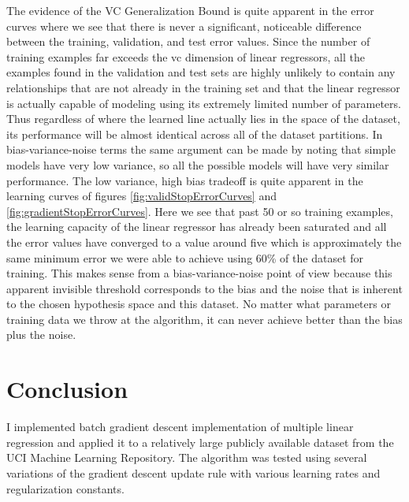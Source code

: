 \documentclass[runningheads]{llncs}
\begin{document}
The evidence of the VC Generalization Bound is quite apparent in the error curves where we see that there is never a significant, noticeable difference between the training, validation, and test error values. Since the number of training examples far exceeds the vc dimension of linear regressors, all the examples found in the validation and test sets are highly unlikely to contain any relationships that are not already in the training set and that the linear regressor is actually capable of modeling using its extremely limited number of parameters. Thus regardless of where the learned line actually lies in the space of the dataset, its performance will be almost identical across all of the dataset partitions. In bias-variance-noise terms the same argument can be made by noting that simple models have very low variance, so all the possible models will have very similar performance. The low variance, high bias tradeoff is quite apparent in the learning curves of figures \ref{fig:validStopErrorCurves} and \ref{fig:gradientStopErrorCurves}. Here we see that past 50 or so training examples, the learning capacity of the linear regressor has already been saturated and all the error values have converged to a value around five which is approximately the same minimum error we were able to achieve using 60\% of the dataset for training. This makes sense from a bias-variance-noise point of view because this apparent invisible threshold corresponds to the bias and the noise that is inherent to the chosen hypothesis space and this dataset. No matter what parameters or training data we throw at the algorithm, it can never achieve better than the bias plus the noise.

\section{Conclusion}

I implemented  batch gradient descent implementation of multiple linear regression and applied it to a relatively large publicly available dataset from the UCI Machine Learning Repository. The algorithm was tested using several variations of the gradient descent update rule with various learning rates and regularization constants. 
\end{document}
